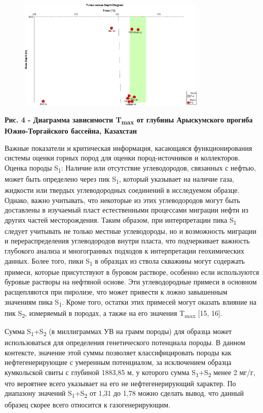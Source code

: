 \begin{figure}[H]
	\centering
	\includegraphics[width=0.8\textwidth]{assets/1261}
	\caption*{}
\end{figure}

{\bfseries Рис. 4 - Диаграмма зависимости T\textsubscript{max} от глубины
Арыскумского прогиба Южно-Торгайского бассейна, Казахстан}

Важные показатели и критическая информация, касающаяся функционирования
системы оценки горных пород для оценки пород-источников и коллекторов.
Оценка породы S\textsubscript{1}: Наличие или отсутствие углеводородов,
связанных с нефтью, может быть определено через пик S\textsubscript{1},
который указывает на наличие газа, жидкости или твердых углеводородных
соединений в исследуемом образце. Однако, важно учитывать, что некоторые
из этих углеводородов могут быть доставлены в изучаемый пласт
естественными процессами миграции нефти из других частей месторождения.
Таким образом, при интерпретации пика S\textsubscript{1} следует
учитывать не только местные углеводороды, но и возможность миграции и
перераспределения углеводородов внутри пласта, что подчеркивает важность
глубокого анализа и многогранных подходов к интерпретации геохимических
данных. Более того, пики S\textsubscript{1} в образцах из ствола
скважины могут содержать примеси, которые присутствуют в буровом
растворе, особенно если используются буровые растворы на нефтяной
основе. Эти углеводородные примеси в основном расщепляются при пиролизе,
что может привести к ложно завышенным значениям пика S\textsubscript{1}.
Кроме того, остатки этих примесей могут оказать влияние на пик
S\textsubscript{2}, измеряемый в породах, а также на его значения
T\textsubscript{max} {[}15, 16{]}.

Сумма S\textsubscript{1}+S\textsubscript{2} (в миллиграммах УВ на грамм
породы) для образца может использоваться для определения генетического
потенциала породы. В данном контексте, значение этой суммы позволяет
классифицировать породы как нефтегенерирующие с умеренным потенциалом,
за исключением образца кумкольской свиты с глубиной 1883,85 м, у
которого сумма S\textsubscript{1}+S\textsubscript{2} менее 2 мг/г, что
вероятнее всего указывает на его не нефтегенерирующий характер. По
диапазону значений S\textsubscript{1}+S\textsubscript{2} от 1,31 до 1,78
можно сделать вывод, что данный образец скорее всего относится к
газогенерирующим.

